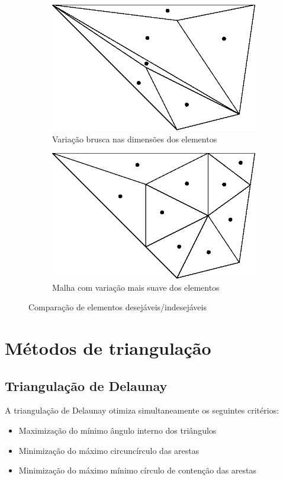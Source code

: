 \begin{figure}[ht]
    \begin{subfigure}{.5\textwidth}
        \centering
        \includegraphics[width=.8\linewidth]{fig/variacao_brusca.eps}
        \caption{Variação brusca nas dimensões dos elementos}
        \label{fig:sub-brusca}
    \end{subfigure}
    \begin{subfigure}{.5\textwidth}
        \centering
        \includegraphics[width=.8\linewidth]{fig/variacao_suave.eps}
        \caption{Malha com variação mais suave dos elementos}
        \label{fig:sub-suave}
    \end{subfigure}
    \caption{Comparação de elementos desejáveis/indesejáveis}
    \label{fig:figlegal}
\end{figure}

\section{Métodos de triangulação}
\subsection{Triangulação de Delaunay}
A triangulação de Delaunay otimiza simultaneamente os seguintes critérios:
\begin{itemize}
    \item Maximização do mínimo ângulo interno dos triângulos
    \item Minimização do máximo circuncírculo das arestas
    \item Minimização do máximo mínimo círculo de contenção das arestas
\end{itemize}


